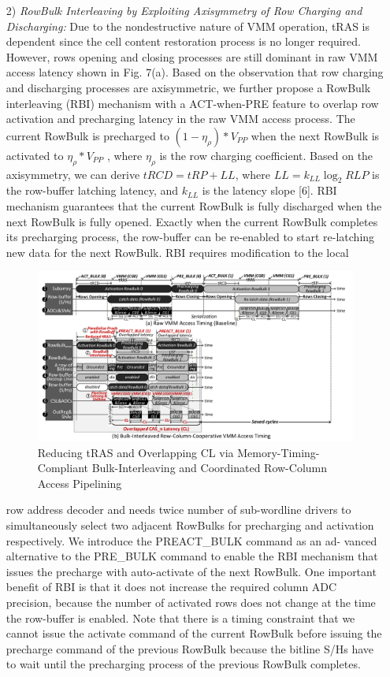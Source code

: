 \documentclass{article}
\begin{document}
\begin{enumerate}
 			\item[2)] \textit{RowBulk Interleaving by Exploiting Axisymmetry of Row
 				Charging and Discharging:} Due to the nondestructive nature
 			of VMM operation, tRAS is dependent since the cell content
 			restoration process is no longer required. However, rows
 			opening and closing processes are still dominant in raw VMM
 			access latency shown in Fig. 7(a). Based on the observation
 			that row charging and discharging processes are axisymmetric,
 			we further propose a RowBulk interleaving (RBI) mechanism
 			with a ACT-when-PRE feature to overlap row activation and
 			precharging latency in the raw VMM access process. The
 			current RowBulk is precharged to $(1 - \eta_{\rho}) * V_{PP}$ when the
 			next RowBulk is activated to $\eta_{\rho} * V_{PP}$ , where $\eta_{\rho}$ is the row
 			charging coefficient. Based on the axisymmetry, we can derive
 			$tRCD = tRP + LL$, where $LL = k_{LL} \log_2 RLP$ is the
 			row-buffer latching latency, and $k_{LL}$ is the latency slope [6].
 			RBI mechanism guarantees that the current RowBulk is fully
 			discharged when the next RowBulk is fully opened. Exactly
 			when the current RowBulk completes its precharging process,
 			the row-buffer can be re-enabled to start re-latching new data
 			for the next RowBulk. RBI requires modification to the local
 			
 			\begin{figure}[h]
 				\centering
 				\includegraphics[width=0.7\linewidth]{images/fig7}
 				\caption{Reducing tRAS and Overlapping CL via Memory-Timing-Compliant Bulk-Interleaving and Coordinated Row-Column Access Pipelining}
 				\label{fig:fig7}
 			\end{figure}
 			
 			row address decoder and needs twice number of sub-wordline
 			drivers to simultaneously select two adjacent RowBulks for
 			precharging and activation respectively.
 			We introduce the PREACT\_BULK command as an ad-
 			vanced alternative to the PRE\_BULK command to enable the
 			RBI mechanism that issues the precharge with auto-activate
 			of the next RowBulk. One important benefit of RBI is that
 			it does not increase the required column ADC precision,
 			because the number of activated rows does not change at the
 			time the row-buffer is enabled. Note that there is a timing
 			constraint that we cannot issue the activate command of the
 			current RowBulk before issuing the precharge command of the
 			previous RowBulk because the bitline S/Hs have to wait until
 			the precharging process of the previous RowBulk completes.
 			

\end{enumerate}
\end{document}
